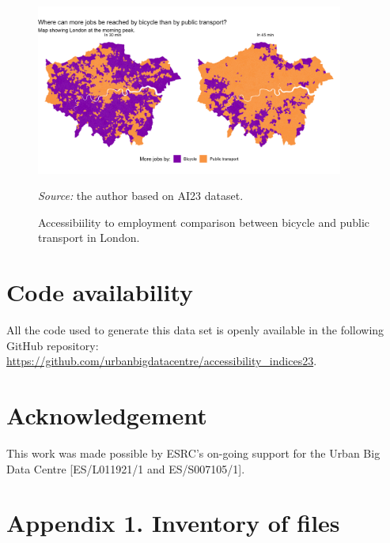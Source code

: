 \documentclass{article}
\begin{document}
\begin{figure}
  \centering
  \includegraphics[width=0.9\textwidth]{../plots/pt_vs_bike_map}
  \caption{Accessibiility to employment comparison between bicycle and public transport in London.}
  \footnotesize{\textit{Source:} the author based on AI23 dataset.}
  \label{fig:bike-comparison}
\end{figure}

\hypertarget{code-availability}{%
\section*{Code availability}\label{code-availability}}

All the code used to generate this data set is openly available in the
following GitHub repository:
\url{https://github.com/urbanbigdatacentre/accessibility_indices23}.

\hypertarget{acknowledgement}{%
\section*{Acknowledgement}\label{acknowledgement}}

This work was made possible by ESRC's on-going support for the Urban Big
Data Centre {[}ES/L011921/1 and ES/S007105/1{]}.

\hypertarget{inventory}{%
\section{Appendix 1. Inventory of files}\label{inventory}}

\begingroup\fontsize{8}{10}\selectfont
\end{document}
